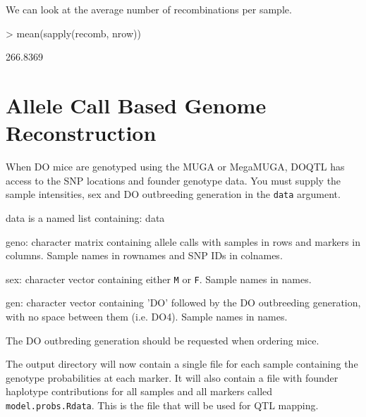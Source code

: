 \documentclass{article}
\begin{document}
We can look at the average number of recombinations per sample.

\begin{Schunk}
\begin{Sinput}
> mean(sapply(recomb, nrow))
\end{Sinput}
\begin{Soutput}
[1] 266.8369
\end{Soutput}
\end{Schunk}

\section{Allele Call Based Genome Reconstruction}

When DO mice are genotyped using the MUGA or MegaMUGA, DOQTL has access to the SNP locations and 
founder genotype data. You must supply the sample intensities, sex and DO outbreeding generation
in the \texttt{data} argument. 

data is a named list containing:
data\begin{description}
  \item{geno: character matrix containing allele calls with samples in rows and markers in columns. Sample names in rownames and SNP IDs in colnames.}
  \item{sex: character vector containing either \texttt{M} or \texttt{F}. Sample names in names.}
  \item{gen: character vector containing 'DO' followed by the DO outbreeding generation, with no space between them (i.e. DO4). Sample names in names.}
\end{description}

The DO outbreding generation should be requested when ordering mice.

\begin{Schunk}
\end{Schunk}

The output directory will now contain a single file for each sample containing the genotype probabilities at each marker. It will also contain a file with founder haplotype contributions for all samples and all markers called \texttt{model.probs.Rdata}. This is the file that will be used for QTL mapping.
\end{document}
